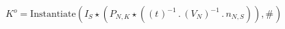 \documentclass[border=1pt]{standalone}
\begin{document}
${K^o}=\text{Instantiate}({I}{_{S}} \star \left({P}{_{N, K}} \star \left(\left( {t}{_{}} \right)^{-1} \, . \, \left( {V}{_{N}} \right)^{-1} \, . \, {n}{_{N, S}}\right)\right), {{\#}}{_{}})$
\end{document}
